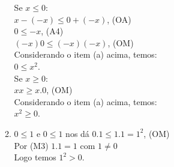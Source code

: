 \documentclass[10pt]{book}
\begin{document}
\begin{enumerate}
\begin{enumerate}
			Se $x \leq 0$:\\
			$x - (-x) \leq 0 + (-x)$, (OA)\\
			$0 \leq -x$, (A4)\\
			$(-x)0 \leq (-x)(-x)$, (OM)\\
			Considerando o item (a) acima, temos:\\
			$0 \leq x^2$.\\
			Se $x \geq 0$:\\
			$xx \geq x.0$, (OM)\\
			Considerando o item (a) acima, temos:\\
			$x^2 \geq 0$.			
			\item
			$0 \leq 1$ e $0 \leq 1$ nos dá $0.1 \leq 1.1 = 1^2$, (OM)\\
			Por (M3) $1.1 = 1$ com $1 \neq 0$\\
			Logo temos $1^2 > 0$.
		\end{enumerate}
\end{enumerate}
\end{document}
